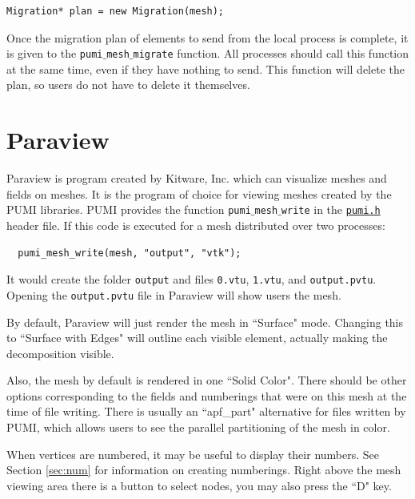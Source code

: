 \documentclass{article}
\begin{document}
{%
\begin{lstlisting}
Migration* plan = new Migration(mesh);
\end{lstlisting}

Once the migration plan of elements to send from
the local process is complete, it is given to the
\texttt{pumi$\_$mesh$\_$migrate} function.
All processes should call this function at the
same time, even if they have nothing to send.
This function will delete the plan, so users
do not have to delete it themselves.

\appendix

\section{Paraview}
\label{sec:paraview}

Paraview is program created by Kitware, Inc. which can visualize meshes
and fields on meshes.
It is the program of choice for viewing meshes created by the PUMI libraries.
PUMI provides the function \texttt{pumi$\_$mesh$\_$write}
in the \href{https://github.com/SCOREC/core/blob/master/pumi/pumi.h}
{\texttt{pumi.h}} header file.
If this code is executed for a mesh distributed over two processes:

\begin{lstlisting}
  pumi_mesh_write(mesh, "output", "vtk");
\end{lstlisting}

It would create the folder \texttt{output} and files \texttt{0.vtu}, \texttt{1.vtu},
and \texttt{output.pvtu}.
Opening the \texttt{output.pvtu} file in Paraview will show users the
mesh.

By default, Paraview will just render the mesh in ``Surface" mode.
Changing this to ``Surface with Edges" will outline each visible element,
actually making the decomposition visible.

Also, the mesh by default is rendered in one ``Solid Color".
There should be other options corresponding to the fields and numberings
that were on this mesh at the time of file writing.
There is usually an ``apf\_part" alternative for files written by PUMI, which
allows users to see the parallel partitioning of the mesh in color.

When vertices are numbered, it may be useful to display their numbers.
See Section \ref{sec:num} for information on creating numberings.
Right above the mesh viewing area there is a button to select nodes,
you may also press the ``D" key.

}
\end{document}
